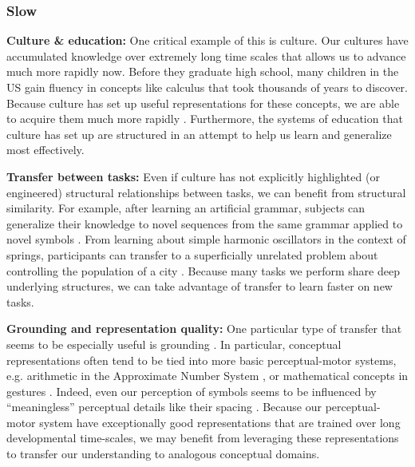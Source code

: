 \documentclass[11pt]{article}
\begin{document}
\subsubsection{Slow}
\textbf{Culture \& education:} One critical example of this is culture. Our cultures have accumulated knowledge over extremely long time scales that allows us to advance much more rapidly now. Before they graduate high school, many children in the US gain fluency in concepts like calculus that took thousands of years to discover. Because culture has set up useful representations for these concepts, we are able to acquire them much more rapidly \citep{McClelland2016}. Furthermore, the systems of education that culture has set up are structured in an attempt to help us learn and generalize most effectively. \par 
\textbf{Transfer between tasks:} Even if culture has not explicitly highlighted (or engineered) structural relationships between tasks, we can benefit from structural similarity. For example, after learning an artificial grammar, subjects can generalize their knowledge to novel sequences from the same grammar applied to novel symbols \citep[e.g.]{Tunney2001}. From learning about simple harmonic oscillators in the context of springs, participants can transfer to a superficially unrelated problem about controlling the population of a city \citep[e.g.]{Day2011}. Because many tasks we perform share deep underlying structures, we can take advantage of transfer to learn faster on new tasks. \par 
\textbf{Grounding and representation quality:} One particular type of transfer that seems to be especially useful is grounding \citep{Barsalou2007}. In particular, conceptual representations often tend to be tied into more basic perceptual-motor systems, e.g. arithmetic in the Approximate Number System \citep{Park2013}, or mathematical concepts in gestures \citep{Goldin-Meadow1993}. Indeed, even our perception of symbols seems to be influenced by ``meaningless'' perceptual details like their spacing \citep{Landy2007}. Because our perceptual-motor system have exceptionally good representations that are trained over long developmental time-scales, we may benefit from leveraging these representations to transfer our understanding to analogous conceptual domains. \par 
\end{document}
